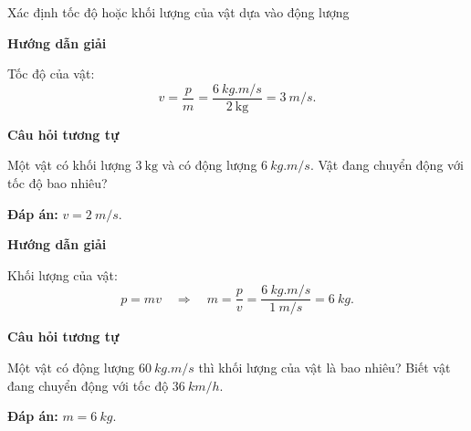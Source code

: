 \begin{dang}{Xác định tốc độ hoặc khối lượng của vật dựa vào động lượng}
	{	\begin{center}
			\textbf{Hướng dẫn giải}
		\end{center}
		
		Tốc độ của vật: $$v=\dfrac{p}{m}=\dfrac{\SI{6}{kg.m/s}}{\SI{2}{\kilogram}}=\SI{3}{m/s}.$$
		
		\begin{center}
			\textbf{Câu hỏi tương tự}
		\end{center}
		
		Một vật có khối lượng $\SI{3}{\kilogram}$ và có động lượng $\SI{6}{kg.m/s}$. Vật đang chuyển động với tốc độ bao nhiêu?
		
		\textbf{Đáp án:} $v=\SI{2}{m/s}$.
	}
	{	\begin{center}
			\textbf{Hướng dẫn giải}
		\end{center}
		
		Khối lượng của vật: $$p=mv\quad\Rightarrow\quad m=\dfrac{p}{v}=\dfrac{\SI{6}{kg.m/s}}{\SI{1}{m/s}}=\SI{6}{kg}.$$
		
		\begin{center}
			\textbf{Câu hỏi tương tự}
		\end{center}
		
		Một vật có động lượng $\SI{60}{kg.m/s}$ thì khối lượng của vật là bao nhiêu? Biết vật đang chuyển động với tốc độ $\SI{36}{km/h}$.
		
		\textbf{Đáp án:} $m=\SI{6}{kg}$.
	}
\end{dang}
